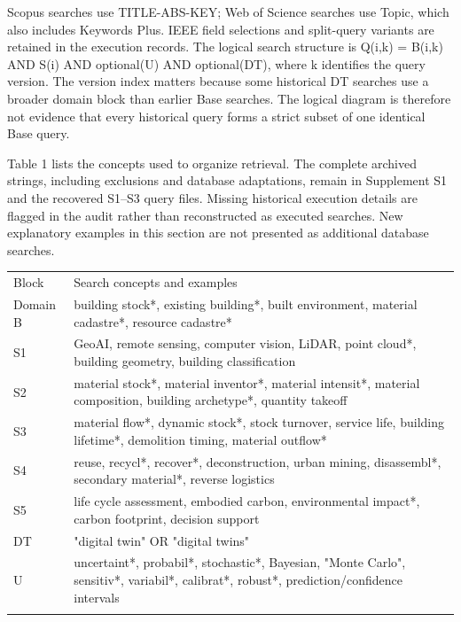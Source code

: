 Scopus searches use TITLE-ABS-KEY; Web of Science searches use Topic, which also includes Keywords Plus. IEEE field selections and split-query variants are retained in the execution records. The logical search structure is Q(i,k) = B(i,k) AND S(i) AND optional(U) AND optional(DT), where k identifies the query version. The version index matters because some historical DT searches use a broader domain block than earlier Base searches. The logical diagram is therefore not evidence that every historical query forms a strict subset of one identical Base query.

Table 1 lists the concepts used to organize retrieval. The complete archived strings, including exclusions and database adaptations, remain in Supplement S1 and the recovered S1--S3 query files. Missing historical execution details are flagged in the audit rather than reconstructed as executed searches. New explanatory examples in this section are not presented as additional database searches.

\begin{center}\small\begin{tabularx}{\linewidth}{XX}\toprule
Block & Search concepts and examples\\\addlinespace
Domain B & building stock*, existing building*, built environment, material cadastre*, resource cadastre*\\\addlinespace
S1 & GeoAI, remote sensing, computer vision, LiDAR, point cloud*, building geometry, building classification\\\addlinespace
S2 & material stock*, material inventor*, material intensit*, material composition, building archetype*, quantity takeoff\\\addlinespace
S3 & material flow*, dynamic stock*, stock turnover, service life, building lifetime*, demolition timing, material outflow*\\\addlinespace
S4 & reuse, recycl*, recover*, deconstruction, urban mining, disassembl*, secondary material*, reverse logistics\\\addlinespace
S5 & life cycle assessment, embodied carbon, environmental impact*, carbon footprint, decision support\\\addlinespace
DT & "digital twin" OR "digital twins"\\\addlinespace
U & uncertaint*, probabil*, stochastic*, Bayesian, "Monte Carlo", sensitiv*, variabil*, calibrat*, robust*, prediction/confidence intervals\\\addlinespace
\bottomrule\end{tabularx}\end{center}

